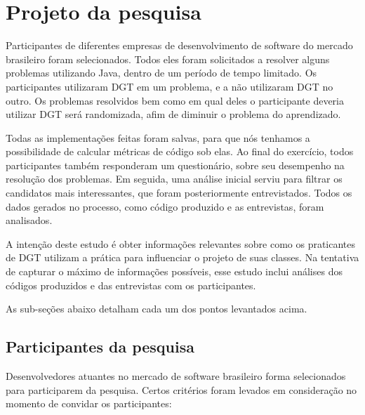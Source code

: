\section{Projeto da pesquisa}

Participantes de diferentes empresas de desenvolvimento de software do mercado
brasileiro foram selecionados. Todos eles foram solicitados a resolver 
alguns problemas utilizando Java, dentro de um período de tempo limitado. 
Os participantes utilizaram DGT em um problema, e a não utilizaram
DGT no outro. Os problemas resolvidos bem como em qual deles o participante
deveria utilizar DGT será randomizada, afim de diminuir o problema do aprendizado.

Todas as implementações feitas foram salvas, para que nós tenhamos a possibilidade
de calcular métricas de código sob elas. Ao final do exercício, todos participantes
também responderam um questionário, sobre seu desempenho na resolução dos problemas.
Em seguida, uma análise inicial serviu para filtrar os candidatos
mais interessantes, que foram posteriormente entrevistados. 
Todos os dados gerados no processo, 
como código produzido e as entrevistas, foram analisados.

A intenção deste estudo é obter informações relevantes sobre como os
praticantes de DGT utilizam a prática para influenciar o projeto de suas
classes. Na tentativa de capturar o máximo de informações possíveis, esse estudo
inclui análises dos códigos produzidos e das entrevistas com os participantes.

As sub-seções abaixo detalham cada um dos pontos levantados acima.

\subsection{Participantes da pesquisa}
\label{sec:planejamento-participantes}

Desenvolvedores atuantes no mercado de 
software brasileiro forma selecionados para participarem da pesquisa.
Certos critérios foram levados em consideração no momento de convidar os participantes:

